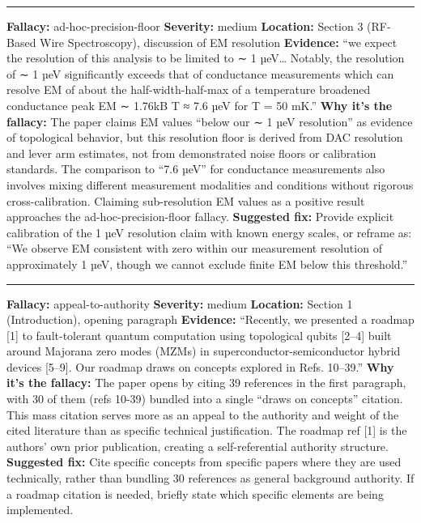 \documentclass[10pt,letterpaper]{article}
\begin{document}
\begin{center}\rule{0.5\linewidth}{0.5pt}\end{center}

\textbf{Fallacy:} ad-hoc-precision-floor
\textbf{Severity:} medium
\textbf{Location:} Section 3 (RF-Based Wire Spectroscopy), discussion of EM resolution
\textbf{Evidence:} ``we expect the resolution of this analysis to be limited to ∼ 1 µeV\ldots{} Notably, the resolution of ∼ 1 µeV significantly exceeds that of conductance measurements which can resolve EM of about the half-width-half-max of a temperature broadened conductance peak EM ∼ 1.76kB T ≈ 7.6 µeV for T = 50 mK.''
\textbf{Why it's the fallacy:} The paper claims EM values ``below our ∼ 1 µeV resolution'' as evidence of topological behavior, but this resolution floor is derived from DAC resolution and lever arm estimates, not from demonstrated noise floors or calibration standards. The comparison to ``7.6 µeV'' for conductance measurements also involves mixing different measurement modalities and conditions without rigorous cross-calibration. Claiming sub-resolution EM values as a positive result approaches the ad-hoc-precision-floor fallacy.
\textbf{Suggested fix:} Provide explicit calibration of the 1 µeV resolution claim with known energy scales, or reframe as: ``We observe EM consistent with zero within our measurement resolution of approximately 1 µeV, though we cannot exclude finite EM below this threshold.''

\begin{center}\rule{0.5\linewidth}{0.5pt}\end{center}

\textbf{Fallacy:} appeal-to-authority
\textbf{Severity:} medium
\textbf{Location:} Section 1 (Introduction), opening paragraph
\textbf{Evidence:} ``Recently, we presented a roadmap {[}1{]} to fault-tolerant quantum computation using topological qubits {[}2--4{]} built around Majorana zero modes (MZMs) in superconductor-semiconductor hybrid devices {[}5--9{]}. Our roadmap draws on concepts explored in Refs. 10--39.''
\textbf{Why it's the fallacy:} The paper opens by citing 39 references in the first paragraph, with 30 of them (refs 10-39) bundled into a single ``draws on concepts'' citation. This mass citation serves more as an appeal to the authority and weight of the cited literature than as specific technical justification. The roadmap ref {[}1{]} is the authors' own prior publication, creating a self-referential authority structure.
\textbf{Suggested fix:} Cite specific concepts from specific papers where they are used technically, rather than bundling 30 references as general background authority. If a roadmap citation is needed, briefly state which specific elements are being implemented.
\end{document}
